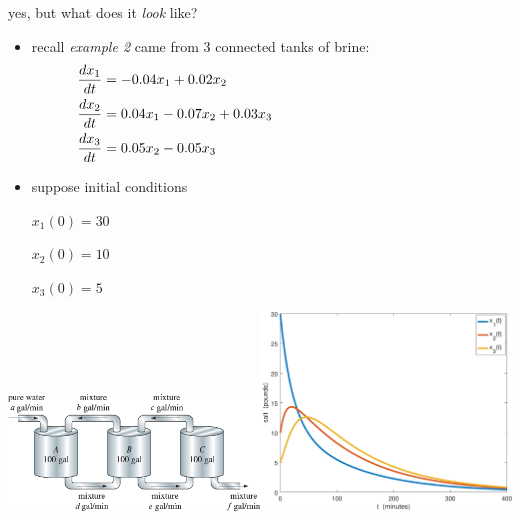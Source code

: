 \documentclass[urlcolor=blue,dvipsnames]{beamer}
\begin{document}
\begin{frame}{yes, but what does it \emph{look} like?}

\begin{itemize}
\item recall \emph{example 2} came from 3 connected tanks of brine:
\small
\begin{align*}
\frac{dx_1}{dt} &= -0.04 x_1 + 0.02 x_2 \hspace{60mm} \\
\frac{dx_2}{dt} &= 0.04 x_1 - 0.07 x_2 + 0.03 x_3 \\
\frac{dx_3}{dt} &= 0.05 x_2 - 0.05 x_3
\end{align*}
\normalsize
\item suppose initial conditions

\small $x_1(0)=30$ 

$x_2(0)=10$

$x_3(0)=5$
\end{itemize}

\vspace{-15mm}
\mbox{\includegraphics[width=0.5\textwidth]{figs/three-tanks}\quad \includegraphics[width=0.5\textwidth]{figs/brines-xvt}}
\end{frame}
\end{document}

